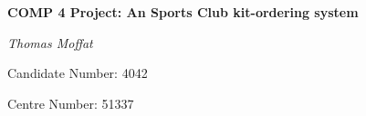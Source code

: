 \documentclass[
11pt, %
a4paper, %
oneside, %
headinclude,footinclude, %
BCOR5mm, %
]{scrartcl}
\begin{document}

\renewcommand{\sectionmark}[1]{\markright{\spacedlowsmallcaps{#1}}} %
\lehead{\mbox{\llap{\small\thepage\kern1em\color{halfgray} \vline}\color{halfgray}\hspace{0.5em}\rightmark\hfil}} %

\pagestyle{scrheadings} %


\begin{titlepage}
	\vspace{5cm}
	\centering
	{\huge\bfseries COMP 4 Project: An Sports Club kit-ordering system\par}
	\vspace{2cm}
	{\Large\itshape Thomas Moffat\par}
	\vspace{1cm}
	{Candidate Number: 4042\par}
	\vspace{1cm}
	{Centre Number: 51337}
	\vfill
\end{titlepage}

\setcounter{tocdepth}{2} %

\tableofcontents %

\listoffigures







\end{document}
